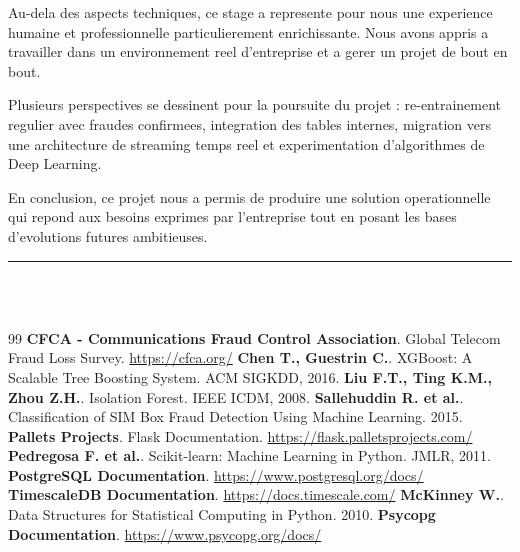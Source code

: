 \documentclass[12pt, oneside, a4paper]{report}
\begin{document}
Au-dela des aspects techniques, ce stage a represente pour nous une experience humaine et professionnelle particulierement enrichissante. Nous avons appris a travailler dans un environnement reel d'entreprise et a gerer un projet de bout en bout.

Plusieurs perspectives se dessinent pour la poursuite du projet : re-entrainement regulier avec fraudes confirmees, integration des tables internes, migration vers une architecture de streaming temps reel et experimentation d'algorithmes de Deep Learning.

En conclusion, ce projet nous a permis de produire une solution operationnelle qui repond aux besoins exprimes par l'entreprise tout en posant les bases d'evolutions futures ambitieuses.

\clearpage
\thispagestyle{fancy}

\noindent\rule[-0.2cm]{0.45cm}{1.2cm}\hspace{0.15cm}%
\raisebox{0.85cm}{\rule{0.85\textwidth}{0.5pt}}\\[0.3cm]
\noindent{}\\[0.5cm]

\begingroup
    \patchcmd{\thebibliography}{\clearpage}{}{}{}
    \patchcmd{\thebibliography}{\chapter*}{}{}{}
    
    \renewcommand{\bibname}{}

\begin{thebibliography}{99}
 \textbf{CFCA - Communications Fraud Control Association}. Global Telecom Fraud Loss Survey. \url{https://cfca.org/}
 \textbf{Chen T., Guestrin C.}. XGBoost: A Scalable Tree Boosting System. ACM SIGKDD, 2016.
 \textbf{Liu F.T., Ting K.M., Zhou Z.H.}. Isolation Forest. IEEE ICDM, 2008.
 \textbf{Sallehuddin R. et al.}. Classification of SIM Box Fraud Detection Using Machine Learning. 2015.
 \textbf{Pallets Projects}. Flask Documentation. \url{https://flask.palletsprojects.com/}
 \textbf{Pedregosa F. et al.}. Scikit-learn: Machine Learning in Python. JMLR, 2011.
 \textbf{PostgreSQL Documentation}. \url{https://www.postgresql.org/docs/}
 \textbf{TimescaleDB Documentation}. \url{https://docs.timescale.com/}
 \textbf{McKinney W.}. Data Structures for Statistical Computing in Python. 2010.
 \textbf{Psycopg Documentation}. \url{https://www.psycopg.org/docs/}
\end{thebibliography}
\end{document}
